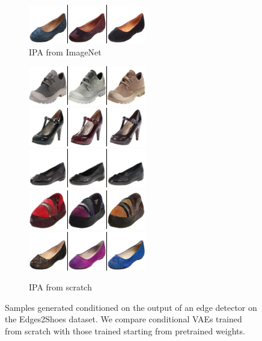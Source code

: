 \begin{figure}[t]
\begin{subfigure}[t]{0.25\textwidth}
      \includegraphics[height=\edgesstuffimgheight]{figs/cigcvae/image-samples/shoes/image_aipo_4_imagenet_samples.png}
      \caption{\scriptsize IPA from ImageNet}
    \end{subfigure}
    \begin{subfigure}[t]{0.25\textwidth}
      \centering
      \includegraphics[height=\edgesstuffimgheight]{figs/cigcvae/image-samples/shoes/image_aipo_0_scratch_samples.png}
      \includegraphics[height=\edgesstuffimgheight]{figs/cigcvae/image-samples/shoes/image_aipo_1_scratch_samples.png}
      \includegraphics[height=\edgesstuffimgheight]{figs/cigcvae/image-samples/shoes/image_aipo_2_scratch_samples.png}
      \includegraphics[height=\edgesstuffimgheight]{figs/cigcvae/image-samples/shoes/image_aipo_3_scratch_samples.png}
      \includegraphics[height=\edgesstuffimgheight]{figs/cigcvae/image-samples/shoes/image_aipo_4_scratch_samples.png}
      \caption{\scriptsize IPA from scratch}
    \end{subfigure}
    \caption{Samples generated conditioned on the output of an edge detector on the Edges2Shoes dataset. We compare conditional VAEs trained from scratch with those trained starting from pretrained weights.}
    \vspace{-.5cm}
    \label{fig:cigcvae-shoes-samples}
  \end{figure}



